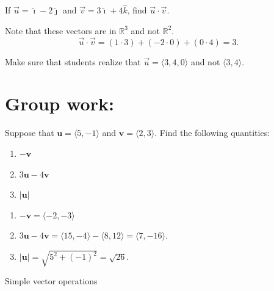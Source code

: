 \documentclass[handout]{ximera}
\begin{document}
\begin{problem}
If $\vec{u} = \hat{\imath} - 2 \hat{\jmath}$ and $\vec{v} = 3 \hat{\imath} + 4 \hat{k}$, find $\vec{u} \cdot \vec{v}$.
	\begin{freeResponse}
	Note that these vectors are in $\mathbb{R}^3$ and not $\mathbb{R}^2$.
	\[
	\vec{u} \cdot \vec{v} = (1 \cdot 3) + (-2 \cdot 0) + (0 \cdot 4) = \boxed{3}.
	\]
	\end{freeResponse}
	
\begin{instructorNotes}
Make sure that students realize that $\vec{u} = \langle 3,4,0 \rangle$ and not $\langle 3,4 \rangle$.
\end{instructorNotes}

\end{problem}






\section{Group work:}

\begin{problem}
Suppose that $\mathbf{u}=\langle5, -1\rangle$ and $\mathbf{v}=\langle 2, 3\rangle$. Find the following quantities:
\begin{enumerate}
\item $-\mathbf{v}$
\item $3\mathbf{u}-4\mathbf{v}$
\item $|\mathbf{u}|$
\end{enumerate}
	\begin{freeResponse}
	\begin{enumerate}
	\item $-\mathbf{v}= \langle -2, -3 \rangle$
	\item $3\mathbf{u}-4\mathbf{v} = \langle 15, -4 \rangle - \langle 8, 12 \rangle = \langle 7, -16 \rangle$.
	\item $|\mathbf{u}|= \sqrt{5^2+(-1)^2} = \sqrt{26}.$
	\end{enumerate}
	\end{freeResponse}
		
\end{problem}

\begin{instructorNotes}
Simple vector operations
\end{instructorNotes}
\end{document}

